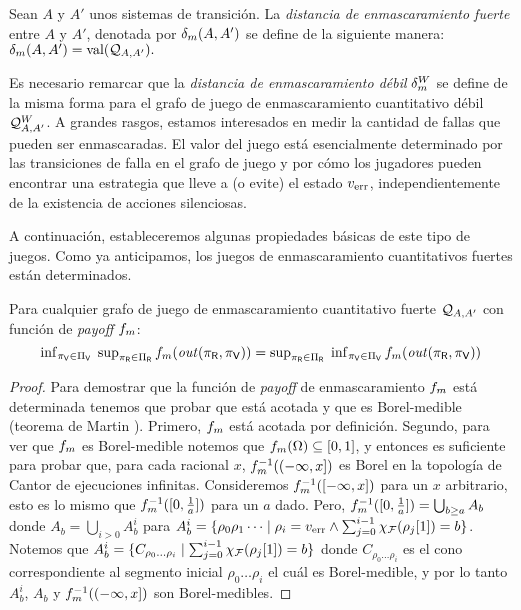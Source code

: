 \begin{definition} \label{def:mask_dist}
 Sean $A$ y $A'$ unos sistemas de transición. 
La \emph{distancia de enmascaramiento fuerte} entre $A$ y $A'$, denotada por $\DeltaMask(A, A')$ se define de la siguiente manera:
$\DeltaMask(A, A') = \val(\QMStrGame).$
\end{definition}

Es necesario remarcar que la \emph{distancia de enmascaramiento débil} $\DeltaMask^W$ se define de la misma forma para el grafo de juego de enmascaramiento cuantitativo débil $\QMWeakGame$.  A grandes rasgos, estamos interesados en medir la cantidad de fallas que pueden ser enmascaradas. El valor del juego está esencialmente determinado por las transiciones de falla en el grafo de juego y por cómo los jugadores pueden encontrar una estrategia que lleve a (o evite) el estado $\ErrorSt$, independientemente de la existencia de acciones silenciosas.

A continuación, estableceremos algunas propiedades básicas de este tipo de juegos. 
Como ya anticipamos, los juegos de enmascaramiento cuantitativos fuertes están determinados.

\begin{theorem} \label{thm:mask_game_det}
  Para cualquier grafo de juego de enmascaramiento cuantitativo fuerte $\QMStrGame$ con función de \textit{payoff} $\FMask$:
  \[\textstyle
  \Inf_{\pi_\Verifier \in \Pi_\Verifier} \; \Sup_{\pi_\Refuter \in \Pi_\Refuter} \FMask(\out(\pi_\Refuter, \pi_\Verifier)) = \Sup_{\pi_\Refuter \in \Pi_\Refuter} \;  \Inf_{\pi_\Verifier \in \Pi_\Verifier} \FMask(\out(\pi_\Refuter, \pi_\Verifier))\]
\end{theorem}
\begin{proof} Para demostrar que la función de \textit{payoff} de enmascaramiento $\FMask$ está determinada tenemos que probar que está acotada y que es Borel-medible (teorema de Martin \cite{Martin98}). Primero, $\FMask$ está acotada por definición. Segundo, para ver que $\FMask$ es Borel-medible notemos que $\FMask(\Omega) \subseteq [0,1]$, y entonces es suficiente para probar que, para cada racional $x$, $\FMask^{-1}((-\infty, x])$ es Borel en la topología de Cantor de ejecuciones infinitas. 
Consideremos $\FMask^{-1}([-\infty,x])$ para un $x$ arbitrario, esto es lo mismo que $\FMask^{-1}([0, \frac{1}{a}])$ para un $a$ dado. Pero, $\FMask^{-1}([0, \frac{1}{a}]) = \bigcup_{b \geq a} A_b$ donde
$A_b = \bigcup_{i >0} A^i_b$ para $A^i_b = \{ \rho_0 \rho_1 \dots \mid \rho_i = \ErrorSt \wedge \sum^{i-1}_{j=0} \chi_{\Faults}(\pr{1}{\rho_j}) =b\}$. Notemos que 
$A^i_b = \{ C_{\rho_0 \dots \rho_i} \mid \sum^{i-1}_{j=0} \chi_{\Faults}(\pr{1}{\rho_j}) =b\}$ donde $C_{\rho_0 \dots \rho_i}$ es el cono correspondiente al segmento inicial 
$\rho_0 \dots \rho_i$ el cuál es Borel-medible, y por lo tanto $A^i_b$, $A_b$ y $\FMask^{-1}((-\infty, x])$ son Borel-medibles.
\qedhere
\end{proof} \\


